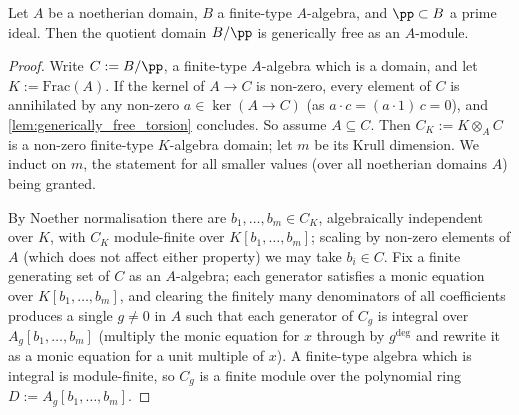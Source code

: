 \begin{lemma}
  \label{lem:generically_free_domain_core}
  Let \(A\) be a noetherian domain, \(B\) a finite-type \(A\)-algebra, and
  \(\pp \subset B\) a prime ideal.  Then the quotient domain \(B/\pp\) is
  generically free as an \(A\)-module.
\end{lemma}

\begin{proof}
\leanok
  Write \(C := B/\pp\), a finite-type \(A\)-algebra which is a domain, and let
  \(K := \mathrm{Frac}(A)\).  If the kernel of \(A \to C\) is non-zero, every
  element of \(C\) is annihilated by any non-zero \(a \in \ker(A \to C)\)
  (as \(a \cdot c = (a \cdot 1)\, c = 0\)), and
  \cref{lem:generically_free_torsion} concludes.  So assume \(A \subseteq C\).
  Then \(C_K := K \otimes_A C\) is a non-zero finite-type \(K\)-algebra domain;
  let \(m\) be its Krull dimension.  We induct on \(m\), the statement for all
  smaller values (over all noetherian domains \(A\)) being granted.

  By Noether normalisation there are \(b_1, \dots, b_m \in C_K\), algebraically
  independent over \(K\), with \(C_K\) module-finite over
  \(K[b_1, \dots, b_m]\); scaling by non-zero elements of \(A\) (which does not
  affect either property) we may take \(b_i \in C\).  Fix a finite generating
  set of \(C\) as an \(A\)-algebra; each generator satisfies a monic equation
  over \(K[b_1, \dots, b_m]\), and clearing the finitely many denominators of
  all coefficients produces a single \(g \ne 0\) in \(A\) such that each
  generator of \(C_g\) is integral over \(A_g[b_1, \dots, b_m]\) (multiply the
  monic equation for \(x\) through by \(g^{\deg}\) and rewrite it as a monic
  equation for a unit multiple of \(x\)).  A finite-type algebra which is
  integral is module-finite, so \(C_g\) is a finite module over the polynomial
  ring \(D := A_g[b_1, \dots, b_m]\).


\end{proof}
